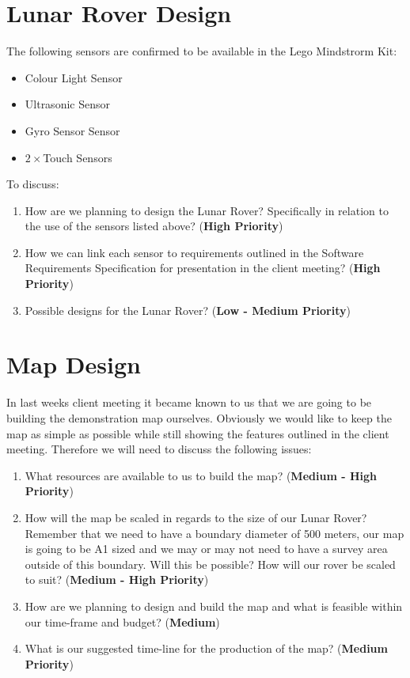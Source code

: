 \documentclass[11pt, a4paper]{article}
\begin{document}
\begin{flushleft}
  \section{Lunar Rover Design}
	
    The following sensors are confirmed to be available in the Lego Mindstrorm Kit:
	\begin{itemize}
    \item Colour Light Sensor
	\item Ultrasonic Sensor
	\item Gyro Sensor Sensor
	\item $2 \times $Touch Sensors
	\end{itemize}
  
  	To discuss:
	\begin{enumerate}
    \item How are we planning to design the Lunar Rover? Specifically in relation to the use of the sensors listed above? ({\bf High Priority})
	\item How we can link each sensor to requirements outlined in the Software Requirements Specification for presentation in the client meeting? ({\bf High Priority})
	\item Possible designs for the Lunar Rover? ({\bf Low - Medium Priority})
	\end{enumerate}
  
  \section{Map Design}
  	In last weeks client meeting it became known to us that we are going to be building the demonstration map ourselves. Obviously we would like to keep the map as simple as possible while still showing the features outlined in the client meeting.  Therefore we will need to discuss the following issues:
	\begin{enumerate}
    \item What resources are available to us to build the map? ({\bf Medium - High Priority})
    \item How will the map be scaled in regards to the size of our Lunar Rover? Remember that we need to have a boundary diameter of 500 meters, our map is going to be A1 sized and we may or may not need to have a survey area outside of this boundary. Will this be possible? How will our rover be scaled to suit? ({\bf Medium - High Priority})
     \item How are we planning to design and build the map and what is feasible within our time-frame and budget? ({\bf Medium})
    \item What is our suggested time-line for the production of the map? ({\bf Medium  Priority})
	\end{enumerate}
  

\end{flushleft}
\end{document}
